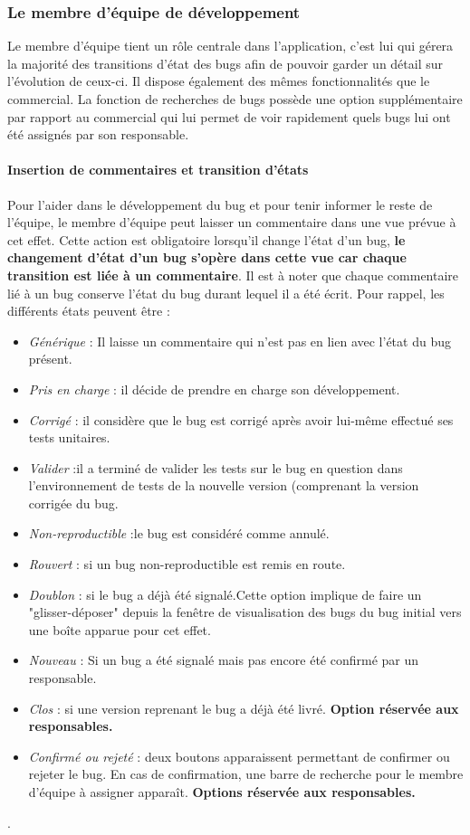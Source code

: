 \documentclass{article}[12pt]
\begin{document}
\subsubsection{Le membre d'équipe de développement}
Le membre d'équipe tient un rôle centrale dans l'application, c'est lui qui gérera la majorité des transitions d'état des bugs afin de pouvoir garder un détail sur l'évolution de ceux-ci. Il dispose également des mêmes fonctionnalités que le commercial. La fonction de recherches de bugs possède une option supplémentaire par rapport au commercial qui lui permet de voir rapidement quels bugs lui ont été assignés par son responsable. 
\paragraph{Insertion de commentaires et transition d'états}
Pour l'aider dans le développement du bug et pour tenir informer le reste de l'équipe, le membre d'équipe peut laisser un commentaire dans une vue prévue à cet effet. Cette action est obligatoire lorsqu'il change l'état d'un bug, \textbf{le changement d'état d'un bug s'opère dans cette vue car chaque transition est liée à un commentaire}. Il est à noter que chaque commentaire lié à un bug conserve l'état du bug durant lequel il a été écrit. Pour rappel, les différents états peuvent être :
 \begin{itemize}
 	\item \textit{Générique} : Il laisse un commentaire qui n'est pas en lien avec l'état du bug présent.
 	\item \textit{Pris en charge} : il décide de prendre en charge son développement.
 	\item \textit{Corrigé} : il considère que le bug est corrigé après avoir lui-même effectué ses tests unitaires.
 	\item \textit{Valider} :il a terminé de valider les tests sur le bug en question dans l'environnement de tests de la nouvelle version (comprenant la version corrigée  du bug.
 	\item \textit{Non-reproductible} :le bug est considéré comme annulé.
 	\item \textit{Rouvert} : si un bug non-reproductible est remis en route.
 	\item \textit{Doublon} : si le bug a déjà été signalé.Cette option implique de faire un "glisser-déposer" depuis la fenêtre de visualisation des bugs du bug initial vers une boîte apparue pour cet effet.
 	\item \textit{Nouveau} : Si un bug a été signalé mais pas encore été confirmé par un responsable.
	\item \textit{Clos} : si une version reprenant le bug a déjà été livré. \textbf{Option réservée aux responsables.}
 	\item \textit{Confirmé ou rejeté} : deux boutons apparaissent permettant de confirmer ou rejeter le bug. En cas de confirmation, une barre de recherche pour le membre d'équipe à assigner apparaît. \textbf{Options réservée aux responsables.}
 \end{itemize}.
\end{document}
